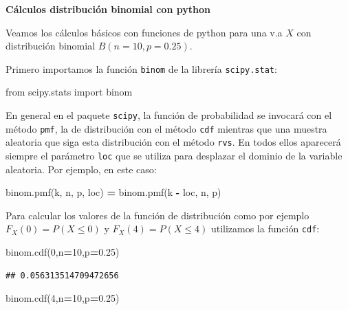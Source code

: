 \documentclass[]{book}
\newenvironment{Shaded}{\begin{snugshade}}{\end{snugshade}}
\newcommand{\DecValTok}[1]{\textcolor[rgb]{0.00,0.00,0.81}{#1}}
\newcommand{\FloatTok}[1]{\textcolor[rgb]{0.00,0.00,0.81}{#1}}
\newcommand{\ImportTok}[1]{#1}
\newcommand{\NormalTok}[1]{#1}
\newcommand{\OperatorTok}[1]{\textcolor[rgb]{0.81,0.36,0.00}{\textbf{#1}}}
\begin{document}
\textbf{Cálculos distribución binomial con python}

Veamos los cálculos básicos con funciones de python para una v.a \(X\) con distribución binomial \(B(n=10,p=0.25)\).

Primero importamos la función \texttt{binom} de la librería \texttt{scipy.stat}:

\begin{Shaded}
\begin{Highlighting}[]
\ImportTok{from}\NormalTok{ scipy.stats }\ImportTok{import}\NormalTok{ binom}
\end{Highlighting}
\end{Shaded}

En general en el paquete \texttt{scipy}, la función de probabilidad se invocará con el método \texttt{pmf}, la de distribución con el método \texttt{cdf} mientras que una muestra aleatoria que siga esta distribución con el método \texttt{rvs}. En todos ellos aparecerá siempre el parámetro \texttt{loc} que se utiliza para desplazar el dominio de la variable aleatoria. Por ejemplo, en este caso:

\begin{Shaded}
\begin{Highlighting}[]
\NormalTok{binom.pmf(k, n, p, loc) }\OperatorTok{=}\NormalTok{  binom.pmf(k }\OperatorTok{-}\NormalTok{ loc, n, p)}
\end{Highlighting}
\end{Shaded}

Para calcular los valores de la función de distribución como por ejemplo \(F_X(0)=P(X\leq 0)\) y \(F_X(4)=P(X\leq 4)\) utilizamos la función \texttt{cdf}:

\begin{Shaded}
\begin{Highlighting}[]
\NormalTok{binom.cdf(}\DecValTok{0}\NormalTok{,n}\OperatorTok{=}\DecValTok{10}\NormalTok{,p}\OperatorTok{=}\FloatTok{0.25}\NormalTok{)}
\end{Highlighting}
\end{Shaded}

\begin{verbatim}
## 0.056313514709472656
\end{verbatim}

\begin{Shaded}
\begin{Highlighting}[]
\NormalTok{binom.cdf(}\DecValTok{4}\NormalTok{,n}\OperatorTok{=}\DecValTok{10}\NormalTok{,p}\OperatorTok{=}\FloatTok{0.25}\NormalTok{)}
\end{Highlighting}
\end{Shaded}
\end{document}
